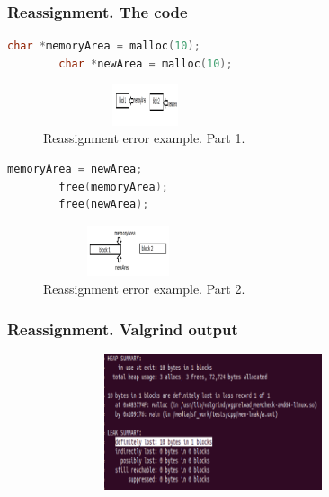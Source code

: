 \documentclass[10pt,xcolor={usenames,dvipsnames}]{beamer}
\begin{document}
\begin{frame}[fragile]
	\frametitle{Reassignment. The code}
	\begin{center}
		\begin{lstlisting}[language=C++, caption={Reassignment error example. Part 1.}]
		char *memoryArea = malloc(10);
		char *newArea = malloc(10);
		\end{lstlisting}

		\begin{figure}
			\includegraphics[height=1.2cm,width=6cm]{reassignment1.png}
			\caption{Reassignment error example. Part 1.}
		\end{figure}

		\begin{lstlisting}[language=C++, caption={Reassignment error example. Part 2.}]
		memoryArea = newArea;
		free(memoryArea);
		free(newArea);
		\end{lstlisting}

		\begin{figure}
			\includegraphics[height=1.5cm,width=5cm]{reassignment2.png}
			\caption{Reassignment error example. Part 2.}
		\end{figure}
	\end{center}
\end{frame}

\begin{frame}[fragile]
	\frametitle{Reassignment. Valgrind output}
	\begin{center}
		\begin{figure}
			\includegraphics[height=4cm,width=10cm]{reassignment-valgrind.png}
		\end{figure}
	\end{center}
\end{frame}
\end{document}
